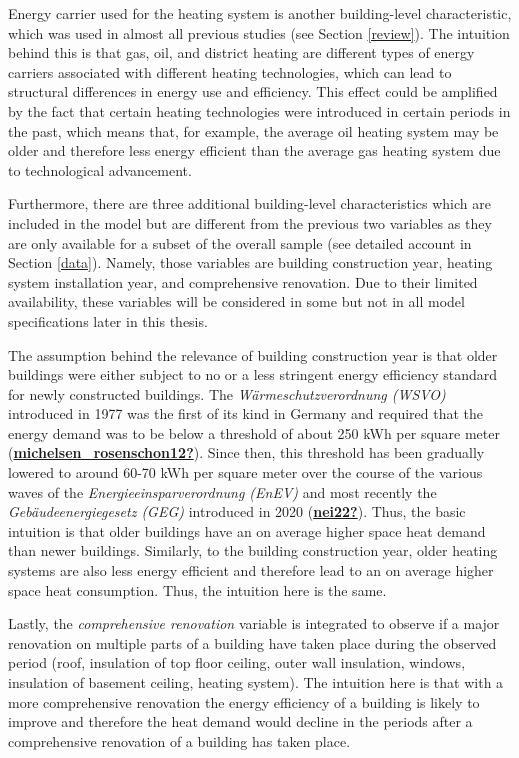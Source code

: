 \documentclass[12pt,twoside]{reedthesis}
\begin{document}
Energy carrier used for the heating system is another building-level characteristic, which was used in almost all previous studies (see Section \ref{review}). The intuition behind this is that gas, oil, and district heating are different types of energy carriers associated with different heating technologies, which can lead to structural differences in energy use and efficiency. This effect could be amplified by the fact that certain heating technologies were introduced in certain periods in the past, which means that, for example, the average oil heating system may be older and therefore less energy efficient than the average gas heating system due to technological advancement.

Furthermore, there are three additional building-level characteristics which are included in the model but are different from the previous two variables as they are only available for a subset of the overall sample (see detailed account in Section \ref{data}). Namely, those variables are building construction year, heating system installation year, and comprehensive renovation. Due to their limited availability, these variables will be considered in some but not in all model specifications later in this thesis.

The assumption behind the relevance of building construction year is that older buildings were either subject to no or a less stringent energy efficiency standard for newly constructed buildings. The \emph{Wärmeschutzverordnung (WSVO)} introduced in 1977 was the first of its kind in Germany and required that the energy demand was to be below a threshold of about 250 kWh per square meter (\protect\hyperlink{ref-michelsen_rosenschon12}{\textbf{michelsen\_rosenschon12?}}). Since then, this threshold has been gradually lowered to around 60-70 kWh per square meter over the course of the various waves of the \emph{Energieeinsparverordnung (EnEV)} and most recently the \emph{Gebäudeenergiegesetz (GEG)} introduced in 2020 (\protect\hyperlink{ref-nei22}{\textbf{nei22?}}). Thus, the basic intuition is that older buildings have an on average higher space heat demand than newer buildings. Similarly, to the building construction year, older heating systems are also less energy efficient and therefore lead to an on average higher space heat consumption. Thus, the intuition here is the same.

Lastly, the \emph{comprehensive renovation} variable is integrated to observe if a major renovation on multiple parts of a building have taken place during the observed period (roof, insulation of top floor ceiling, outer wall insulation, windows, insulation of basement ceiling, heating system). The intuition here is that with a more comprehensive renovation the energy efficiency of a building is likely to improve and therefore the heat demand would decline in the periods after a comprehensive renovation of a building has taken place.
\end{document}
